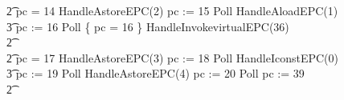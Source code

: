 \begin{figure}[t!]
\begin{circus}
    \t2 {} \circelse pc = 14 \circthen HandleAstoreEPC(2) \circseq pc := 15 \circseq Poll \circseq HandleAloadEPC(1) \circseq \\
    \t3 pc := 16 \circseq Poll \circseq \{ pc = 16 \} \circseq HandleInvokevirtualEPC(36) \\
    \t2 {} \cdots {} \\
    \t2 {} \circelse pc = 17 \circthen HandleAstoreEPC(3) \circseq pc := 18 \circseq Poll \circseq HandleIconstEPC(0) \circseq \\
    \t3 pc := 19 \circseq Poll \circseq HandleAstoreEPC(4) \circseq pc := 20 \circseq Poll \circseq pc := 39 \\
    \t2 {} \cdots {} \\

\end{circus}
\end{figure}
